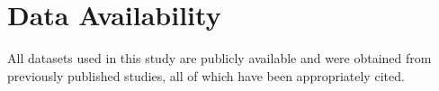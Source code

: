 \documentclass[10pt,a4paper]{article}
\begin{document}


\section*{Data Availability}
All datasets used in this study are publicly available and were obtained from previously published studies, all of which have been appropriately cited.

% 

% 
% 
 

\end{document}
